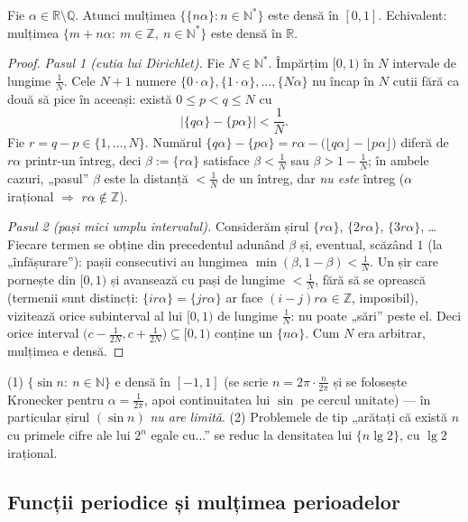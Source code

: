 \begin{teorema}[Kronecker]
Fie $\alpha\in\mathbb{R}\setminus\mathbb{Q}$. Atunci mulțimea $\big\{\{n\alpha\}:n\in\mathbb{N}^*\big\}$ este densă în $[0,1]$. Echivalent: mulțimea $\{m+n\alpha:\ m\in\mathbb{Z},\ n\in\mathbb{N}^*\}$ este densă în $\mathbb{R}$.
\end{teorema}
\begin{proof}
\emph{Pasul 1 (cutia lui Dirichlet).} Fie $N\in\mathbb{N}^*$. Împărțim $[0,1)$ în $N$ intervale de lungime $\frac1N$. Cele $N+1$ numere $\{0\cdot\alpha\},\{1\cdot\alpha\},\dots,\{N\alpha\}$ nu încap în $N$ cutii fără ca două să pice în aceeași: există $0\le p<q\le N$ cu
\[
\big|\{q\alpha\}-\{p\alpha\}\big|<\frac1N.
\]
Fie $r=q-p\in\{1,\dots,N\}$. Numărul $\{q\alpha\}-\{p\alpha\}=r\alpha-\big(\lfloor q\alpha\rfloor-\lfloor p\alpha\rfloor\big)$ diferă de $r\alpha$ printr-un întreg, deci $\beta:=\{r\alpha\}$ satisface $\beta<\frac1N$ sau $\beta>1-\frac1N$; în ambele cazuri, „pasul'' $\beta$ este la distanță $<\frac1N$ de un întreg, dar \emph{nu este} întreg ($\alpha$ irațional $\Rightarrow$ $r\alpha\notin\mathbb{Z}$).

\emph{Pasul 2 (pași mici umplu intervalul).} Considerăm șirul $\{r\alpha\}$, $\{2r\alpha\}$, $\{3r\alpha\}$, \dots{} Fiecare termen se obține din precedentul adunând $\beta$ și, eventual, scăzând $1$ (la „înfășurare''): pașii consecutivi au lungimea $\min(\beta,1-\beta)<\frac1N$. Un șir care pornește din $[0,1)$ și avansează cu pași de lungime $<\frac1N$, fără să se oprească (termenii sunt distincți: $\{i r\alpha\}=\{j r\alpha\}$ ar face $(i-j)r\alpha\in\mathbb{Z}$, imposibil), vizitează orice subinterval al lui $[0,1)$ de lungime $\frac1N$: nu poate „sări'' peste el. Deci orice interval $\big(c-\frac1{2N},c+\frac1{2N}\big)\subseteq[0,1)$ conține un $\{n\alpha\}$. Cum $N$ era arbitrar, mulțimea e densă.
\end{proof}

\begin{obs}
(1) $\{\sin n:\ n\in\mathbb{N}\}$ e densă în $[-1,1]$ (se scrie $n=2\pi\cdot\frac{n}{2\pi}$ și se folosește Kronecker pentru $\alpha=\frac{1}{2\pi}$, apoi continuitatea lui $\sin$ pe cercul unitate) --- în particular șirul $(\sin n)$ \emph{nu are limită}. (2) Problemele de tip „arătați că există $n$ cu primele cifre ale lui $2^n$ egale cu...'' se reduc la densitatea lui $\{n\lg2\}$, cu $\lg2$ irațional.
\end{obs}

\subsection{Funcții periodice și mulțimea perioadelor}

